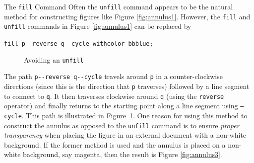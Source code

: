 \begin{subsection}{The \texttt{fill} Command}
Often the \texttt{unfill} command appears to be the natural method for constructing figures like Figure \ref{fig:annulus1}.  However, the \texttt{fill} and \texttt{unfill} commands in Figure \ref{fig:annulus1} can be replaced by \begin{center}\verb|fill p--reverse q--cycle withcolor bbblue;|\end{center}
\begin{figure}[t]
	\begin{center}\end{center}
	\caption{Avoiding an \texttt{unfill}}\label{fig:annulus2}
\end{figure}
The path \verb|p--reverse q--cycle| travels around \texttt{p} in a counter-clockwise directions (since this is the direction that \texttt{p} traverses) followed by a line segment to connect to \texttt{q}.  It then traverses clockwise around \texttt{q} (using the \texttt{reverse} operator) and finally returns to the starting point along a line segment using \texttt{--cycle}.  This path is illustrated in Figure~\ref{fig:annulus2}.  One reason for using this method to construct the annulus as opposed to the \texttt{unfill} command is to ensure \textit{proper transparency} when placing the figure in an external document with a non-white background.  If the former method is used and the annulus is placed on a non-white background, say magenta, then the result is Figure \ref{fig:annulus3}.
\begin{figure}[ht]
	\begin{center}\end{center}

\end{figure}
\end{subsection}
